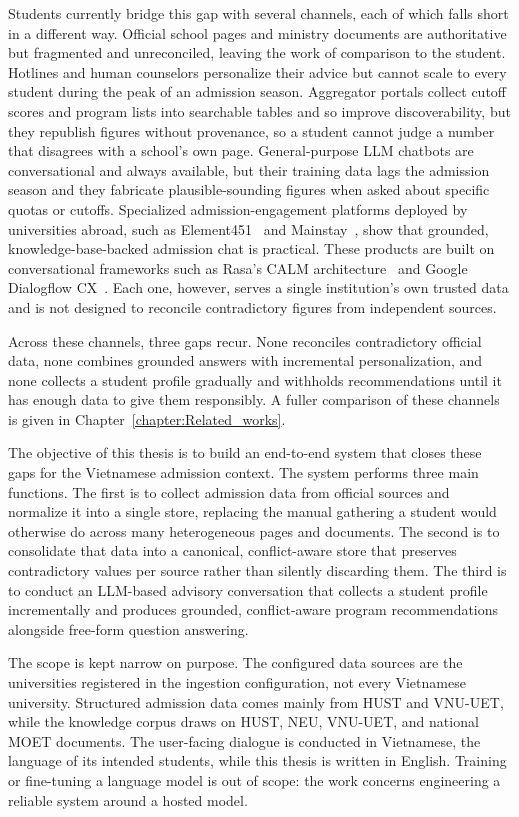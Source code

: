 \documentclass[../main.tex]{subfiles}
\begin{document}
Students currently bridge this gap with several channels, each of which falls short in a different way.
Official school pages and ministry documents are authoritative but fragmented and unreconciled, leaving the work of comparison to the student.
Hotlines and human counselors personalize their advice but cannot scale to every student during the peak of an admission season.
Aggregator portals collect cutoff scores and program lists into searchable tables and so improve discoverability, but they republish figures without provenance, so a student cannot judge a number that disagrees with a school's own page.
General-purpose \gls{LLM} chatbots are conversational and always available, but their training data lags the admission season and they fabricate plausible-sounding figures when asked about specific quotas or cutoffs.
Specialized admission-engagement platforms deployed by universities abroad, such as Element451~\cite{element451} and Mainstay~\cite{mainstay}, show that grounded, knowledge-base-backed admission chat is practical.
These products are built on conversational frameworks such as Rasa's \gls{CALM} architecture~\cite{rasa_calm} and Google Dialogflow CX~\cite{dialogflow}.
Each one, however, serves a single institution's own trusted data and is not designed to reconcile contradictory figures from independent sources.

Across these channels, three gaps recur.
None reconciles contradictory official data, none combines grounded answers with incremental personalization, and none collects a student profile gradually and withholds recommendations until it has enough data to give them responsibly.
A fuller comparison of these channels is given in Chapter~\ref{chapter:Related_works}.

The objective of this thesis is to build an end-to-end system that closes these gaps for the Vietnamese admission context.
The system performs three main functions.
The first is to collect admission data from official sources and normalize it into a single store, replacing the manual gathering a student would otherwise do across many heterogeneous pages and documents.
The second is to consolidate that data into a canonical, conflict-aware store that preserves contradictory values per source rather than silently discarding them.
The third is to conduct an \gls{LLM}-based advisory conversation that collects a student profile incrementally and produces grounded, conflict-aware program recommendations alongside free-form question answering.

The scope is kept narrow on purpose.
The configured data sources are the universities registered in the ingestion configuration, not every Vietnamese university.
Structured admission data comes mainly from \gls{HUST} and \gls{VNU-UET}, while the knowledge corpus draws on HUST, \gls{NEU}, VNU-UET, and national \gls{MOET} documents.
The user-facing dialogue is conducted in Vietnamese, the language of its intended students, while this thesis is written in English.
Training or fine-tuning a language model is out of scope: the work concerns engineering a reliable system around a hosted model.
\end{document}
